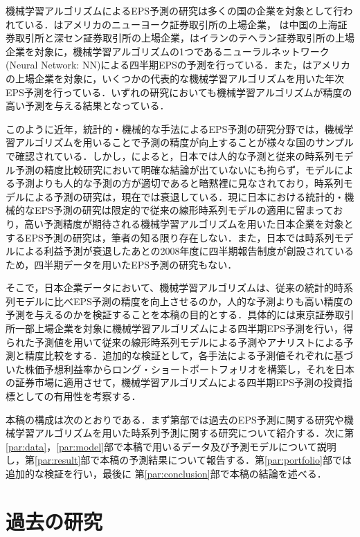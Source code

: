 \documentclass[a4paper，11pt]{jsarticle}
\begin{document}
機械学習アルゴリズムによるEPS予測の研究は多くの国の企業を対象として行われている．\cite{zhang2004neural}はアメリカのニューヨーク証券取引所の上場企業，\cite*{cao2009forecasting} は中国の上海証券取引所と深セン証券取引所の上場企業，\cite{etemadi2015earnings}はイランのテヘラン証券取引所の上場企業を対象に，機械学習アルゴリズムの1つであるニューラルネットワーク(Neural Network: NN)による四半期EPSの予測を行っている．また，\cite*{cao2020fundamental}はアメリカの上場企業を対象に，いくつかの代表的な機械学習アルゴリズムを用いた年次EPS予測を行っている．いずれの研究においても機械学習アルゴリズムが精度の高い予測を与える結果となっている．

このように近年，統計的・機械的な手法によるEPS予測の研究分野では，機械学習アルゴリズムを用いることで予測の精度が向上することが様々な国のサンプルで確認されている．しかし，\cite{ota2006}によると，日本では人的な予測と従来の時系列モデル予測の精度比較研究において明確な結論が出ていないにも拘らず，モデルによる予測よりも人的な予測の方が適切であると暗黙裡に見なされており，時系列モデルによる予測の研究は，現在では衰退している．現に日本における統計的・機械的なEPS予測の研究は限定的で従来の線形時系列モデルの適用に留まっており，高い予測精度が期待される機械学習アルゴリズムを用いた日本企業を対象とするEPS予測の研究は，筆者の知る限り存在しない．また，日本では時系列モデルによる利益予測が衰退したあとの2008年度に四半期報告制度が創設されているため，四半期データを用いたEPS予測の研究もない．

そこで，日本企業データにおいて、機械学習アルゴリズムは、従来の統計的時系列モデルに比べEPS予測の精度を向上させるのか，人的な予測よりも高い精度の予測を与えるのかを検証することを本稿の目的とする．具体的には東京証券取引所一部上場企業を対象に機械学習アルゴリズムによる四半期EPS予測を行い，得られた予測値を用いて従来の線形時系列モデルによる予測やアナリストによる予測と精度比較をする．追加的な検証として，各手法による予測値それぞれに基づいた株価予想利益率からロング・ショートポートフォリオを構築し，それを日本の証券市場に適用させて，機械学習アルゴリズムによる四半期EPS予測の投資指標としての有用性を考察する．

本稿の構成は次のとおりである．まず第\ref{par:litrev}部では過去のEPS予測に関する研究や機械学習アルゴリズムを用いた時系列予測に関する研究について紹介する．次に第\ref{par:data}，\ref{par:model}部で本稿で用いるデータ及び予測モデルについて説明し，第\ref{par:result}部で本稿の予測結果について報告する．第\ref{par:portfolio}部では追加的な検証を行い，最後に 第\ref{par:conclusion}部で本稿の結論を述べる．

\part{過去の研究} \label{par:litrev}
\end{document}
